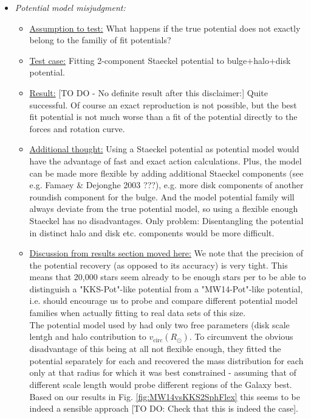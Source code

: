 \begin{itemize}
\begin{itemize}
\item \emph{Potential model misjudgment:} 
\begin{itemize} 
\item \underline{Assumption to test:} What happens if the true potential does not exactly belong to the familiy of fit potentials?
\item \underline{Test case:} Fitting 2-component Staeckel potential to bulge+halo+disk potential.
\item \underline{Result:} [TO DO - No definite result after this disclaimer:] Quite successful. Of course an exact reproduction is not possible, but the best fit potential is not much worse than a fit of the potential directly to the forces and rotation curve.  
\item \underline{Additional thought:} Using a Staeckel potential as potential model would have the advantage of fast and exact action calculations. Plus, the model can be made more flexible by adding additional Staeckel components (see e.g. Famaey \& Dejonghe 2003 ???), e.g. more disk components of another roundish component for the bulge. And the model potential family will always deviate from the true potential model, so using a flexible enough Staeckel has no disadvantages. Only problem: Disentangling the potential in distinct halo and disk etc. components would be more difficult.
\item \underline{Discussion from results section moved here:} %
We note that the precision of the potential recovery (as opposed to its accuracy) is very tight. This means that 20,000 stars seem already to be enough stars per \MAP to be able to distinguish a "KKS-Pot"-like potential from a "MW14-Pot"-like potential, i.e. should encourage us to probe and compare different potential model families when actually fitting to real data sets of this size.
\\The potential model used by \citet{bov13} had only two free parameters (disk scale lentgh and halo contribution to $v_\text{circ}(R_\odot)$. To circumvent the obvious disadvantage of this being at all not flexible enough, they fitted the potential separately for each \MAP and recovered the mass distribution for each \MAP only at that radius for which it was best constrained - assuming that \MAPs of different scale length would probe different regions of the Galaxy best. Based on our results in Fig. \ref{fig:MW14vsKKS2SphFlex} this seems to be indeed a sensible approach [TO DO: Check that this is indeed the case].

\end{itemize}
\end{itemize}
\end{itemize}
